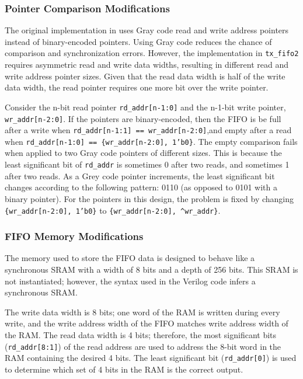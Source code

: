 \subsubsection{Pointer Comparison Modifications}
The original implementation in \cite{async-fifo} uses Gray code read and write address pointers instead of binary-encoded pointers. Using Gray code reduces the chance of comparison and synchronization errors. However, the implementation in \texttt{tx\_fifo2} requires asymmetric read and write data widths, resulting in different read and write address pointer sizes. Given that the read data width is half of the write data width, the read pointer requires one more bit over the write pointer.

Consider the n-bit read pointer \texttt{rd\_addr[n-1:0]} and the n-1-bit write pointer, \texttt{wr\_addr[n-2:0]}. If the pointers are binary-encoded, then the FIFO is be full after a write when \texttt{rd\_addr[n-1:1] == wr\_addr[n-2:0]},and empty after a read when \texttt{rd\_addr[n-1:0] == \{wr\_addr[n-2:0], 1'b0\}}. The empty comparison fails when applied to two Gray code pointers of different sizes. This is because the least significant bit of \texttt{rd\_addr} is sometimes 0 after two reads, and sometimes 1 after two reads. As a Grey code pointer increments, the least significant bit changes according to the following pattern: 0110 (as opposed to 0101 with a binary pointer). For the pointers in this design, the problem is fixed by changing \texttt{\{wr\_addr[n-2:0], 1'b0\}} to \texttt{\{wr\_addr[n-2:0], \textasciicircum wr\_addr\}}.

\subsubsection{FIFO Memory Modifications}
The memory used to store the FIFO data is designed to behave like a synchronous SRAM with a width of 8 bits and a depth of 256 bits. This SRAM is not instantiated; however, the syntax used in the Verilog code infers a synchronous SRAM.

The write data width is 8 bits; one word of the RAM is written during every write, and the write address width of the FIFO matches write address width of the RAM. The read data width is 4 bits; therefore, the most significant bits (\texttt{rd\_addr[8:1]}) of the read address are used to address the 8-bit word in the RAM containing the desired 4 bits. The least significant bit (\texttt{rd\_addr[0]}) is used to determine which set of 4 bits in the RAM is the correct output.

